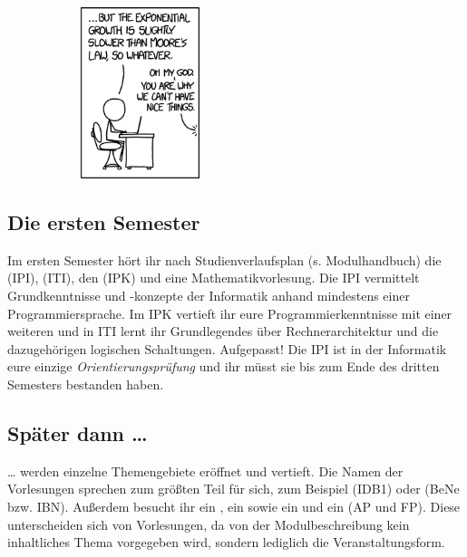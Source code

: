 \begin{figure}[th]
    \begin{subfigure}{.23\textwidth}
	    \includegraphics[height=5cm]{bilder/backing_up_4.png}
    \end{subfigure}
\end{figure}

\subsection{Die ersten Semester}

Im ersten Semester hört ihr nach Studienverlaufsplan (s. Modulhandbuch) die  (\gls{IPI}),  (\gls{ITI}), den  (\gls{IPK}) und eine Mathematikvorlesung. Die \gls{IPI} vermittelt Grundkenntnisse und -konzepte der Informatik anhand mindestens einer Programmiersprache. Im \gls{IPK} vertieft ihr eure Programmierkenntnisse mit einer weiteren und in \gls{ITI} lernt ihr Grundlegendes über Rechnerarchitektur und die dazugehörigen logischen Schaltungen. Aufgepasst! Die \gls{IPI} ist in der Informatik eure einzige \emph{Orientierungsprüfung} und ihr müsst sie bis zum Ende des dritten Semesters bestanden haben.


\subsection{Später dann \dots{}}

\dots{} werden einzelne Themengebiete eröffnet und vertieft. Die Namen der Vorlesungen sprechen zum größten Teil für sich, zum Beispiel  (\gls{IDB1}) oder  (\gls{BeNe} bzw. IBN). Außerdem besucht ihr ein , ein  sowie ein  und ein  (\gls{AP} und \gls{FP}). Diese unterscheiden sich von Vorlesungen, da von der Modulbeschreibung kein inhaltliches Thema vorgegeben wird, sondern lediglich die Veranstaltungsform.

